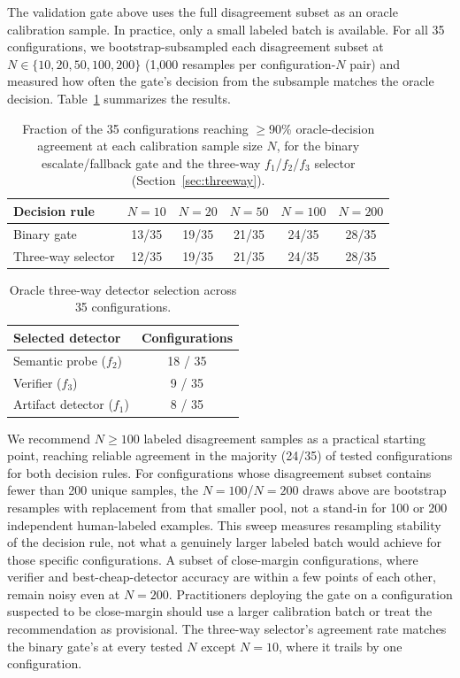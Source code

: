 \documentclass{ieeeaccess}
\begin{document}
The validation gate above uses the full disagreement subset as an oracle
calibration sample. In practice, only a small labeled batch is available.
For all 35 configurations, we bootstrap-subsampled each disagreement subset
at $N \in \{10, 20, 50, 100, 200\}$ (1{,}000 resamples per configuration-$N$
pair) and measured how often the gate's decision from the subsample matches
the oracle decision. Table~\ref{tab:sensitivity} summarizes the results.

\FloatBarrier
\begin{table}[t]
\centering
\small
\caption{Fraction of the 35 configurations reaching $\geq$90\% oracle-decision agreement at each calibration sample size $N$, for the binary escalate/fallback gate and the three-way $f_1$/$f_2$/$f_3$ selector (Section~\ref{sec:threeway}).}
\label{tab:sensitivity}
\begin{tabular}{lccccc}
\toprule
Decision rule & $N{=}10$ & $N{=}20$ & $N{=}50$ & $N{=}100$ & $N{=}200$ \\
\midrule
Binary gate         & 13/35 & 19/35 & 21/35 & 24/35 & 28/35 \\
Three-way selector  & 12/35 & 19/35 & 21/35 & 24/35 & 28/35 \\
\bottomrule
\end{tabular}
\end{table}
\FloatBarrier

\FloatBarrier
\begin{table}[h]
\centering
\small
\caption{Oracle three-way detector selection across 35 configurations.}
\label{tab:threeway}
\begin{tabular}{lc}
\toprule
Selected detector & Configurations \\
\midrule
Semantic probe ($f_2$) & 18 / 35 \\
Verifier ($f_3$)       &  9 / 35 \\
Artifact detector ($f_1$) & 8 / 35 \\
\bottomrule
\end{tabular}
\end{table}
\FloatBarrier

We recommend $N \geq 100$ labeled disagreement samples as a practical
starting point, reaching reliable agreement in the majority (24/35) of
tested configurations for both decision rules. For configurations whose
disagreement subset contains fewer than 200 unique samples, the $N=100$/$N=200$
draws above are bootstrap resamples with replacement from that smaller pool,
not a stand-in for 100 or 200 independent human-labeled examples. This sweep
measures resampling stability of the decision rule, not what a genuinely larger
labeled batch would achieve for those specific configurations. A subset of
close-margin configurations, where verifier and best-cheap-detector accuracy
are within a few points of each other, remain noisy even at $N=200$.
Practitioners deploying the gate on a configuration suspected to be close-margin
should use a larger calibration batch or treat the recommendation as provisional.
The three-way selector's agreement rate matches the binary gate's at every tested
$N$ except $N=10$, where it trails by one configuration.
\end{document}
